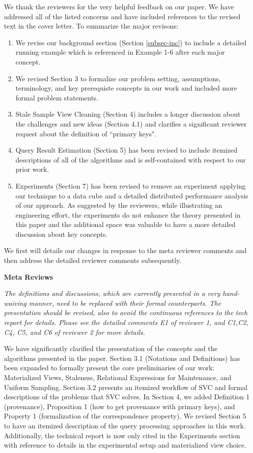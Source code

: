 We thank the reviewers for the very helpful feedback on our paper. We have addressed all of the listed concerns and have included references to the revised text in the cover letter. 
To summarize the major revisons:
\begin{enumerate}
\item We revise our background section (Section \ref{subsec-inc}) to include a detailed running example which is referenced in Example 1-6 after each major concept.
\item We revised Section 3 to formalize our problem setting, assumptions, terminology, and key prerequiste concepts in our work and included more formal problem statements.
\item Stale Sample View Cleaning (Section 4) includes a longer discussion about the challenges and new ideas (Section 4.1) and clarifies a significant reviewer request about the definition of ``primary keys".
\item Query Result Estimation (Section 5) has been revised to include itemized descriptions of all of the algorithms and is self-contained with respect to our prior work.
\item Experiments (Section 7) has been revised to remove an experiment applying our technique to a data cube and a detailed distributed performance analysis of our approach. As suggested by the reviewers, while illustrating an engineering effort, the experiments do not enhance the theory presented in this paper and the additional space was valuable to have a more detailed discussion about key concepts.
\end{enumerate}
We first will detaile our changes in response to the meta reviewer comments and then address the detailed reviewer comments subsequently.

\vspace{1em}
\noindent\textbf{Meta Reviews}

\emph{The definitions and discussions, which are currently presented in a very hand-waiving manner, need to be replaced with their formal counterparts. The presentation should be revised, also to avoid the continuous references to the tech report for details. Please see the detailed comments E1 of reviewer 1, and C1,C2, C4, C5, and C6 of reviewer 2 for more details.}

We have significantly clarified the presentation of the concepts and the algorithms presented in the paper. Section 3.1 (Notations and Definitions) has been expanded to formally present the core preliminaries of our work: Materialized Views, Staleness, Relational Expressions for Maintenance, and Uniform Sampling. Section 3.2 presents an itemized workflow of SVC and formal descriptions of the problems that SVC solves. In Section 4, we added Definition 1 (provenance), Proposition 1 (how to get provenance with primary keys), and Property 1 (formalization of the correspondence property). We revised Section 5 to have an itemized description of the query processing approaches in this work.  Additionally, the technical report is now only cited in the Experiments section with reference to details in the experimental setup and materialized view choice.

